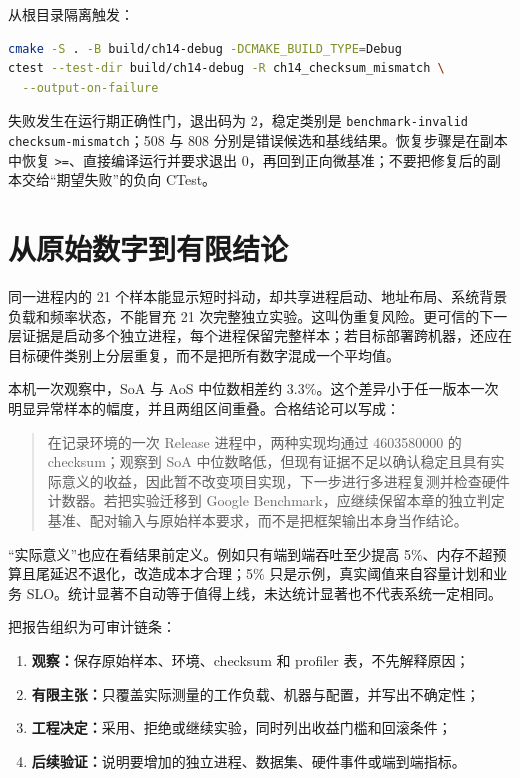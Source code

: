 

从根目录隔离触发：

\begin{lstlisting}[language=bash,numbers=none]
cmake -S . -B build/ch14-debug -DCMAKE_BUILD_TYPE=Debug
ctest --test-dir build/ch14-debug -R ch14_checksum_mismatch \
  --output-on-failure
\end{lstlisting}

失败发生在运行期正确性门，退出码为 2，稳定类别是 \texttt{benchmark-invalid checksum-mismatch}；508 与 808 分别是错误候选和基线结果。恢复步骤是在副本中恢复 \texttt{>=}、直接编译运行并要求退出 0，再回到正向微基准；不要把修复后的副本交给“期望失败”的负向 CTest。

\section{从原始数字到有限结论}

同一进程内的 21 个样本能显示短时抖动，却共享进程启动、地址布局、系统背景负载和频率状态，不能冒充 21 次完整独立实验。这叫伪重复风险。更可信的下一层证据是启动多个独立进程，每个进程保留完整样本；若目标部署跨机器，还应在目标硬件类别上分层重复，而不是把所有数字混成一个平均值。

本机一次观察中，SoA 与 AoS 中位数相差约 3.3\%。这个差异小于任一版本一次明显异常样本的幅度，并且两组区间重叠。合格结论可以写成：

\begin{quote}
在记录环境的一次 Release 进程中，两种实现均通过 4603580000 的 checksum；观察到 SoA 中位数略低，但现有证据不足以确认稳定且具有实际意义的收益，因此暂不改变项目实现，下一步进行多进程复测并检查硬件计数器。若把实验迁移到 Google Benchmark，应继续保留本章的独立判定基准、配对输入与原始样本要求，而不是把框架输出本身当作结论\autocite{googlebenchmark}。
\end{quote}

“实际意义”也应在看结果前定义。例如只有端到端吞吐至少提高 5\%、内存不超预算且尾延迟不退化，改造成本才合理；5\% 只是示例，真实阈值来自容量计划和业务 SLO。统计显著不自动等于值得上线，未达统计显著也不代表系统一定相同。

把报告组织为可审计链条：
\begin{enumerate}
  \item \textbf{观察：}保存原始样本、环境、checksum 和 profiler 表，不先解释原因；
  \item \textbf{有限主张：}只覆盖实际测量的工作负载、机器与配置，并写出不确定性；
  \item \textbf{工程决定：}采用、拒绝或继续实验，同时列出收益门槛和回滚条件；
  \item \textbf{后续验证：}说明要增加的独立进程、数据集、硬件事件或端到端指标。
\end{enumerate}

